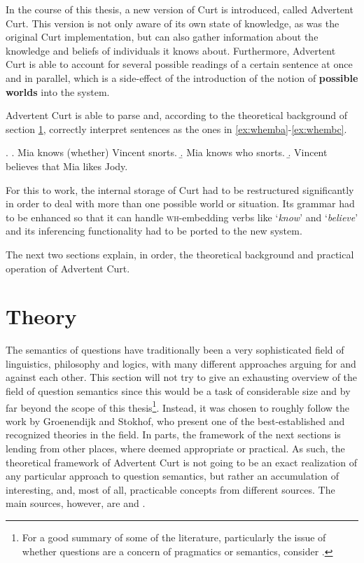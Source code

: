 \documentclass[a4paper]{article}
\newcommand{\term}[1]{\textsf{\textbf{#1}}} %
\newcommand{\pn}{\textsf} %
\newcommand{\example}[1]{`\textit{#1}'} %
\newcommand{\wh}{\textsc{wh}}
\newcommand{\curt}{\pn{Curt}}
\newcommand{\acurt}{\pn{Advertent Curt}}
\theoremstyle{remark}
\theoremstyle{remark}
\theoremstyle{definition}
\theoremstyle{definition}
\begin{document}
In the course of this thesis, a new version of \curt{} is introduced, called
\acurt. This version is not only aware of its own state of knowledge, as was the
original \curt{} implementation, but can also gather information about the
knowledge and beliefs of individuals it knows about. Furthermore, \acurt{} is
able to account for several possible readings of a certain sentence at once and
in parallel, which is a side-effect of the introduction of the notion of
\term{possible worlds} into the system.

\acurt{} is able to parse and, according to the theoretical background of section
\ref{sec:theory}, correctly interpret sentences as the ones in
\ref{ex:whemba}-\ref{ex:whembc}.

\ex.
\a.  Mia knows (whether) Vincent snorts.\label{ex:whemba}
\b.  Mia knows who snorts.
\b.  Vincent believes that Mia likes Jody.\label{ex:whembc}

For this to work, the internal storage of \curt{} had to be restructured
significantly in order to deal with more than one possible world or situation.
Its grammar had to be enhanced so that it can handle \wh-embedding verbs
like \example{know} and \example{believe} and its inferencing functionality had
to be ported to the new system.

The next two sections explain, in order, the theoretical background and
practical operation of \acurt{}.

\section{Theory}\label{sec:theory}

The semantics of questions have traditionally been a very sophisticated field of
linguistics,  philosophy and logics, with many different approaches arguing for
and against each other. This section will not try to give an exhausting overview
of the field of question semantics since this would be a task of considerable
size and by far beyond the scope of this thesis\footnote{For a good summary of
some of the literature, particularly the issue of whether questions are a
concern of pragmatics or semantics, consider \cite[section 2 and 3]{gs:q}.}.
Instead, it was chosen to roughly follow the work by Groenendijk and Stokhof,
who present one of the best-established and recognized theories in the field.
In parts, the framework of the next sections is lending from other places, where
deemed appropriate or practical. As such, the theoretical framework of \acurt{}
is not going to be an exact realization of any particular approach to question
semantics, but rather an accumulation of interesting, and, most of all,
practicable concepts from different sources. The main sources, however, are
\cite{gs:q} and \cite{gs:sqpa}.
\end{document}

